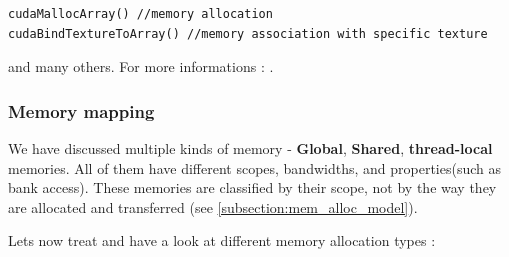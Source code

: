 \begin{verbatim}
cudaMallocArray() //memory allocation
cudaBindTextureToArray() //memory association with specific texture
\end{verbatim}

and many others. For more informations : \cite{noauthor_steps3d_nodate}.

\subsubsection{Memory mapping}
\label{subsub:mem_mapping}
We have discussed multiple kinds of memory - \textbf{Global}, \textbf{Shared}, 
\textbf{thread-local} memories. All of them have different scopes, 
bandwidths, and properties(such as bank access). These memories are classified by their scope, 
not by the way they are allocated and transferred (see \ref{subsection:mem_alloc_model}).

%
%
%
%

Lets now treat and have a look at different memory allocation types \cite{memory_model}:


